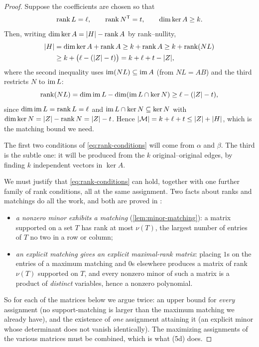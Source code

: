 \begin{proof}
Suppose the coefficients are chosen so that
\begin{equation}\label{eq:rank-conditions}
 \operatorname{rank} L=\ell,\qquad \operatorname{rank} N^{\mathsf T}=t,\qquad \dim\ker A\ge k .
\end{equation}
Then, writing $\dim\ker A=\lvert H\rvert-\operatorname{rank} A$ by rank--nullity,
\begin{align}
 \lvert H\rvert&=\dim\ker A+\operatorname{rank} A\ge k+\operatorname{rank} A\ge k+\operatorname{rank}(NL)\notag\\
 &\ge k+\bigl(\ell-(\lvert Z\rvert-t)\bigr)=k+\ell+t-\lvert Z\rvert ,
 \label{eq:rank-bound}
\end{align}
where the second inequality uses $\operatorname{im}(NL)\subseteq\operatorname{im} A$ (from $NL=AB$) and the third restricts $N$
to $\operatorname{im} L$:
\begin{equation}\label{eq:rank-restrict}
 \operatorname{rank}(NL)=\dim\operatorname{im} L-\dim(\operatorname{im} L\cap\ker N)\ge\ell-(\lvert Z\rvert-t),
\end{equation}
since $\dim\operatorname{im} L=\operatorname{rank} L=\ell$ and $\operatorname{im} L\cap\ker N\subseteq\ker N$ with
$\dim\ker N=\lvert Z\rvert-\operatorname{rank} N=\lvert Z\rvert-t$. Hence $\lvert \mathcal M\rvert=k+\ell+t\le\lvert Z\rvert+\lvert H\rvert$, which is
the matching bound we need.

The first two conditions of \eqref{eq:rank-conditions} will come from $\alpha$ and $\beta$. The third
is the subtle one: it will be produced from the $k$ original--original edges, by finding $k$
independent vectors in $\ker A$.

We must justify that \eqref{eq:rank-conditions} can hold, together with one further family of rank
conditions, all at the same assignment. Two facts about ranks and matchings do all the work, and both
are proved in :
\begin{itemize}[leftmargin=1.4em,itemsep=1pt,topsep=1pt]
\item \emph{a nonzero minor exhibits a matching} (\cref{lem:minor-matching}): a matrix supported on a
 set $T$ has rank at most $\nu(T)$, the largest number of entries of $T$ no two in a row or column;
\item \emph{an explicit matching gives an explicit maximal-rank matrix}: placing $1$s on the entries
 of a maximum matching and $0$s elsewhere produces a matrix of rank $\nu(T)$ supported on $T$,
 and every nonzero minor of such a matrix is a product of \emph{distinct} variables, hence a nonzero
 polynomial.
\end{itemize}
So for each of the matrices below we argue twice: an upper bound for \emph{every} assignment (no
support-matching is larger than the maximum matching we already have), and the existence of \emph{one}
assignment attaining it (an explicit minor whose determinant does not vanish identically). The
maximizing assignments of the various matrices must be combined, which is what (5d) does.


\end{proof}
